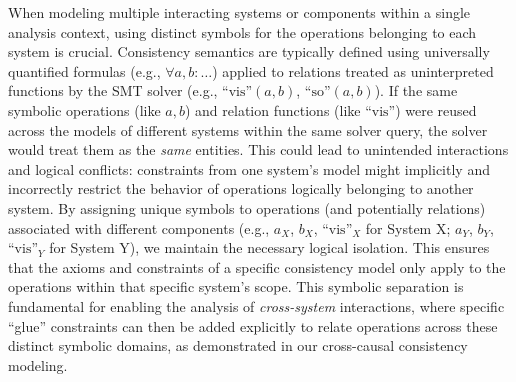 When modeling multiple interacting systems or components within a single
analysis context, using distinct symbols for the operations belonging to each
system is crucial. Consistency semantics are typically defined using universally
quantified formulas (e.g., $\forall a, b: \dots$) applied to relations treated as
uninterpreted functions by the SMT solver (e.g., $\text{``vis''}(a, b)$, $\text{``so''}(a, b)$).
If the same symbolic operations (like $a, b$) and relation functions (like $\text{``vis''}$)
were reused across the models of different systems within the same solver query,
the solver would treat them as the \textit{same} entities. This could lead to
unintended interactions and logical conflicts: constraints from one system's
model might implicitly and incorrectly restrict the behavior of operations
logically belonging to another system. By assigning unique symbols to operations
(and potentially relations) associated with different components (e.g., $a_X$, $b_X$, $\text{``vis''}_X$ for
System X; $a_Y$, $b_Y$, $\text{``vis''}_Y$ for System Y), we maintain the necessary
logical isolation. This ensures that the axioms and constraints of a specific
consistency model only apply to the operations within that specific system's
scope. This symbolic separation is fundamental for enabling the analysis of
\textit{cross-system} interactions, where specific ``glue'' constraints can then be added
explicitly to relate operations across these distinct symbolic domains, as
demonstrated in our cross-causal consistency modeling.

%
%
%

